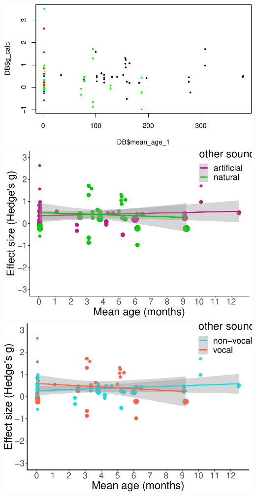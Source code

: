 \documentclass[man]{apa6}
\begin{document}
\includegraphics{MA_speech_pref_files/figure-latex/plots-1.pdf}
\includegraphics{MA_speech_pref_files/figure-latex/plots-2.pdf}
\includegraphics{MA_speech_pref_files/figure-latex/plots-3.pdf}
\end{document}
